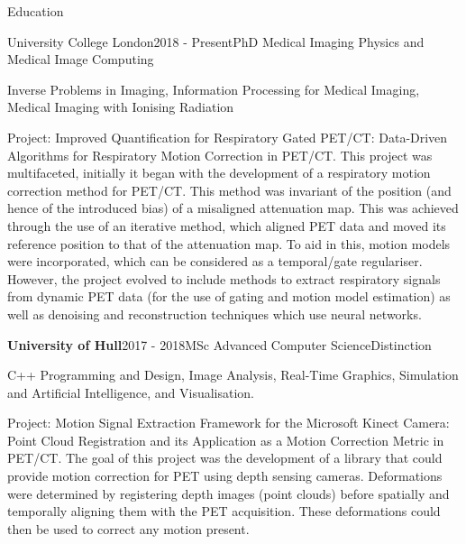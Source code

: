 \documentclass{cv}
\begin{document}
    \begin{rSection}{Education}
        \item \begin{rSubsection}{University College London}{2018 - Present}{PhD Medical Imaging Physics and Medical Image Computing}{}            
            \item Inverse Problems in Imaging, Information Processing for Medical Imaging, Medical Imaging with Ionising Radiation
            
            \item Project: Improved Quantification for Respiratory Gated PET/CT: Data-Driven Algorithms for Respiratory Motion Correction in PET/CT. This project was multifaceted, initially it began with the development of a respiratory motion correction method for PET/CT. This method was invariant of the position (and hence of the introduced bias) of a misaligned attenuation map. This was achieved through the use of an iterative method, which aligned PET data and moved its reference position to that of the attenuation map. To aid in this, motion models were incorporated, which can be considered as a temporal/gate regulariser. However, the project evolved to include methods to extract respiratory signals from dynamic PET data (for the use of gating and motion model estimation) as well as denoising and reconstruction techniques which use neural networks.
        \end{rSubsection}
        
        \item \begin{rSubsection}{\bf University of Hull}{2017 - 2018}{MSc Advanced Computer Science}{Distinction}
            \item C++ Programming and Design, Image Analysis, Real-Time Graphics, Simulation and Artificial Intelligence, and Visualisation.
            
            \item Project: Motion Signal Extraction Framework for the Microsoft Kinect Camera: Point Cloud Registration and its Application as a Motion Correction Metric in PET/CT. The goal of this project was the development of a library that could provide motion correction for PET using depth sensing cameras. Deformations were determined by registering depth images (point clouds) before spatially and temporally aligning them with the PET acquisition. These deformations could then be used to correct any motion present.
        \end{rSubsection}
        

\end{rSection}
\end{document}

